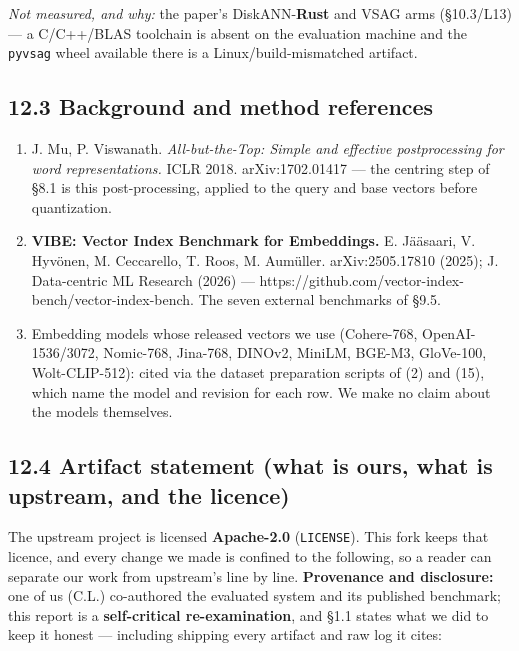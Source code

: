 \documentclass[
  10pt,
]{article}
\providecommand{\tightlist}{%
  \setlength{\itemsep}{0pt}\setlength{\parskip}{0pt}}
\begin{document}
\emph{Not measured, and why:} the paper's DiskANN-\textbf{Rust} and VSAG
arms (§10.3/L13) --- a C/C++/BLAS toolchain is absent on the evaluation
machine and the \texttt{pyvsag} wheel available there is a
Linux/build-mismatched artifact.

\subsection{12.3 Background and method
references}\label{background-and-method-references}

\begin{enumerate}
\def\labelenumi{\arabic{enumi}.}
\setcounter{enumi}{13}
\tightlist
\item
  J. Mu, P. Viswanath. \emph{All-but-the-Top: Simple and effective
  postprocessing for word representations.} ICLR 2018. arXiv:1702.01417
  --- the centring step of §8.1 is this post-processing, applied to the
  query and base vectors before quantization.
\item
  \textbf{VIBE: Vector Index Benchmark for Embeddings.} E. Jääsaari, V.
  Hyvönen, M. Ceccarello, T. Roos, M. Aumüller. arXiv:2505.17810 (2025);
  J. Data-centric ML Research (2026) ---
  https://github.com/vector-index-bench/vector-index-bench. The seven
  external benchmarks of §9.5.
\item
  Embedding models whose released vectors we use (Cohere-768,
  OpenAI-1536/3072, Nomic-768, Jina-768, DINOv2, MiniLM, BGE-M3,
  GloVe-100, Wolt-CLIP-512): cited via the dataset preparation scripts
  of (2) and (15), which name the model and revision for each row. We
  make no claim about the models themselves.
\end{enumerate}

\subsection{12.4 Artifact statement (what is ours, what is upstream, and
the
licence)}\label{artifact-statement-what-is-ours-what-is-upstream-and-the-licence}

The upstream project is licensed \textbf{Apache-2.0} (\texttt{LICENSE}).
This fork keeps that licence, and every change we made is confined to
the following, so a reader can separate our work from upstream's line by
line. \textbf{Provenance and disclosure:} one of us (C.L.) co-authored
the evaluated system and its published benchmark; this report is a
\textbf{self-critical re-examination}, and §1.1 states what we did to
keep it honest --- including shipping every artifact and raw log it
cites:
\end{document}
